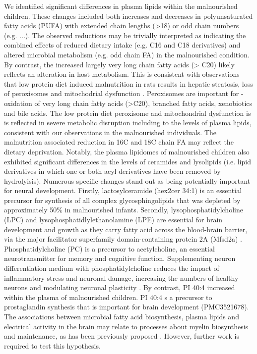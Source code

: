 \documentclass{article}
\begin{document}
We identified significant differences in plasma lipids within the malnourished children.
These changes included both increases and decreases in polyunsaturated fatty acids (PUFA) with extended chain lengths (\textgreater{}18) or odd chain numbers (e.g. ...).
The observed reductions may be trivially interpreted as indicating the combined effects of reduced dietary intake (e.g. C16 and C18 derivatives) and altered microbial metabolism (e.g. odd chain FA) in the malnourished condition.
By contrast, the increased largely very long chain fatty acids (> C20) likely reflects an alteration in host metabolism.
This is consistent with observations that low protein diet induced malnutrition in rats results in hepatic steatosis, loss of peroxisomes and mitochodrial dysfunction \cite{van2016malnutrition}.
Peroxisomes are important for \textbeta{}-oxidation of very long chain fatty acids (\textgreater{}C20), branched fatty acids, xenobiotics and bile acids.
The low protein diet peroxisome and mitochondrial dysfunction is is reflected in severe metabolic disruption including to the levels of plasma lipids, consistent with our observations in the malnourished individuals.
The malnutrition associated reduction in 16C and 18C chain FA may reflect the dietary deprivation.
Notably, the plasma lipidomes of malnourished children also exhibited significant differences in the levels of ceramides and lysolipids (i.e. lipid derivatives in which one or both acyl derivatives have been removed by hydrolyisis).
Numerous specific changes stand out as being potentially important for neural development.
Firstly, lactosylceramide (hex2cer 34:1) is an essential precursor for synthesis of all complex glycosphingolipids \cite{d2013glycosphingolipids} that was depleted by approximately 50\% in malnourished infants.
Secondly, lysophosphatidylcholine (LPC) and lysophosphatidlylethanolamine (LPE) are essential for brain development and growth as they carry fatty acid across the blood-brain barrier, via the major facilitator superfamily domain-containing protein 2A (Mfsd2a) \cite{tan2020emerging}.
Phosphatidylcholine (PC) is a precursor to acetylcholine, an essential neurotransmitter for memory and cognitive function.
Supplementing neuron differentiation medium with phosphatidylcholine reduces the impact of inflammatory stress and neuronal damage, increasing the numbers of healthy neurons and modulating neuronal plasticity \cite{magaquian2021phosphatidylcholine}.
By contrast, PI 40:4 increased within the plasma of malnourished children.
PI 40:4 s a precursor to prostaglandin synthesis that is important for brain development (PMC3521678).
The associations between microbial fatty acid biosynthesis, plasma lipids and electrical activity in the brain may relate to processes about myelin biosynthesis and maintenance, as has been previously proposed \cite{nunez2015eeg}.
However, further work is required to test this hypothesis. 
\end{document}
